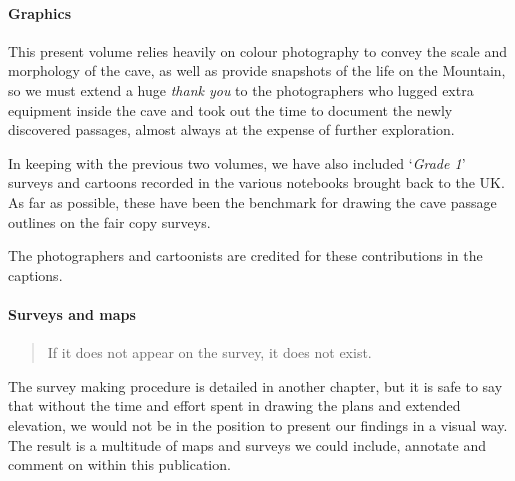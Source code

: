 \begin{tcolorbox}
\begin{fullwidth}
\begin{multicols}{2}
 			\paragraph{Graphics}

 			This present volume relies heavily on colour photography to convey the scale and morphology of the cave, as well as provide snapshots of the life on the Mountain, so we must extend a huge \emph{thank you} to the photographers who lugged extra equipment inside the cave and took out the time to document the newly discovered passages, almost always at the expense of further exploration. 

 			In keeping with the previous two volumes, we have also included `\emph{Grade 1}' surveys and cartoons recorded in the various notebooks brought back to the UK. As far as possible, these have been the benchmark for drawing the cave passage outlines on the fair copy surveys. 

 			The photographers and cartoonists are credited for these contributions in the captions.

 			\paragraph{Surveys and maps}

 			\begin{quote}If it does not appear on the survey, it does not exist. 
 			\end{quote}
 			The survey making procedure is detailed in another chapter, but it is safe to say that without the time and effort spent in drawing the plans and extended elevation, we would not be in the position to present our findings in a visual way. The result is a multitude of maps and surveys we could include, annotate and comment on within this publication. 



 		\end{multicols}
 	\end{fullwidth}
 \end{tcolorbox}
